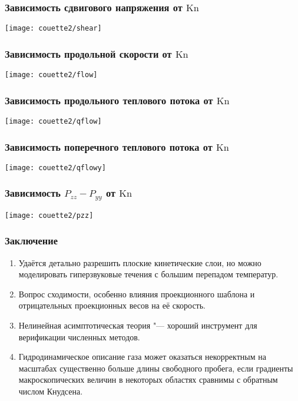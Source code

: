 \documentclass[mathserif]{beamer} %
\newcommand{\Kn}{\mathrm{Kn}}
\begin{document}
\begin{frame}
    \frametitle{Зависимость сдвигового напряжения от \(\Kn\)}
    \vspace{-2pt}
    \centering\hspace{-1.5cm}
    \texttt{[image: couette2/shear]}
    \hspace{-1.5cm}
\end{frame}

\begin{frame}
    \frametitle{Зависимость продольной скорости от \(\Kn\)}
    \vspace{-2pt}
    \centering\hspace{-1.5cm}
    \texttt{[image: couette2/flow]}
    \hspace{-1.5cm}
\end{frame}

\begin{frame}
    \frametitle{Зависимость продольного теплового потока от \(\Kn\)}
    \vspace{-2pt}
    \centering\hspace{-1.5cm}
    \texttt{[image: couette2/qflow]}
    \hspace{-1.5cm}
\end{frame}

\begin{frame}
    \frametitle{Зависимость поперечного теплового потока от \(\Kn\)}
    \vspace{-2pt}
    \centering\hspace{-1.5cm}
    \texttt{[image: couette2/qflowy]}
    \hspace{-1.5cm}
\end{frame}

\begin{frame}
    \frametitle{Зависимость \(P_{zz}-P_{yy}\) от \(\Kn\)}
    \vspace{-2pt}
    \centering\hspace{-1.5cm}
    \texttt{[image: couette2/pzz]}
    \hspace{-1.5cm}
\end{frame}

\begin{frame}
    \frametitle{Заключение}
    \begin{enumerate}
        \item Удаётся детально разрешить плоские кинетические слои,
        но можно моделировать гиперзвуковые течения с большим перепадом температур.
        \item Вопрос сходимости, особенно влияния проекционного шаблона
        и отрицательных проекционных весов на её скорость.
        \item Нелинейная асимптотическая теория "--- хороший инструмент для верификации
        численных методов.
        \item Гидродинамическое описание газа может оказаться некорректным на масштабах существенно больше длины свободного пробега,
        если градиенты макроскопических величин в некоторых областях сравнимы с обратным числом Кнудсена.
    \end{enumerate}
\end{frame}
\end{document}
